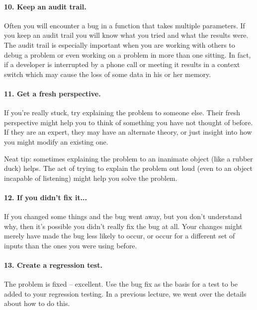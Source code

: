 \paragraph{10. Keep an audit trail.}
Often you will encounter a bug in a function that takes multiple parameters. If you keep an audit trail you will know what you tried and what the results were. The audit trail is especially important when you are working with others to debug a problem or even working on a problem in more than one sitting. In fact, if a developer is interrupted by a phone call or meeting it results in a context switch which may cause the loss of some data in his or her memory.

\paragraph{11. Get a fresh perspective.}
If you're really stuck, try explaining the problem to someone else. Their fresh perspective might help you to think of something you have not thought of before. If they are an expert, they may have an alternate theory, or just insight into how you might modify an existing one.

Neat tip: sometimes explaining the problem to an inanimate object (like a rubber duck) helps. The act of trying to explain the problem out loud (even to an object incapable of listening) might help you solve the problem.

\paragraph{12. If you didn't fix it...}
If you changed some things and the bug went away, but you don't understand why, then it's possible you didn't really fix the bug at all. Your changes might merely have made the bug less likely to occur, or occur for a different set of inputs than the ones you were using before.

\paragraph{13. Create a regression test.}
The problem is fixed -- excellent. Use the bug fix as the basis for a test to be added to your regression testing. In a previous lecture, we went over the details about how to do this.




